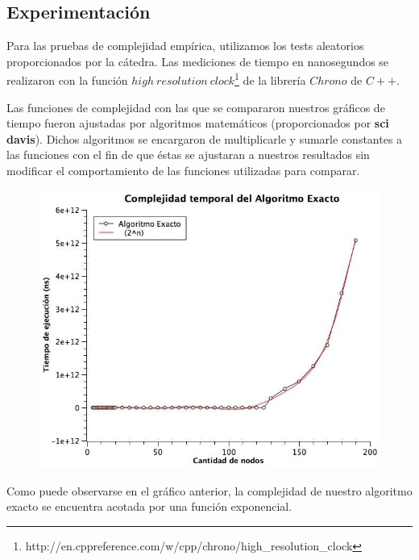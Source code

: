 \subsection{Experimentación}

Para las pruebas de complejidad empírica, utilizamos los tests aleatorios proporcionados por la cátedra. Las mediciones de tiempo en nanosegundos se realizaron con la función $high\ resolution\ clock$\footnote{http://en.cppreference.com/w/cpp/chrono/high\_resolution\_clock} de la librería $Chrono$ de $C++$. 

Las funciones de complejidad con las que se compararon nuestros gráficos de tiempo fueron ajustadas por algoritmos matemáticos (proporcionados por \textbf{sci davis}). Dichos algoritmos se encargaron de multiplicarle y sumarle constantes a las funciones con el fin de que éstas se ajustaran a nuestros resultados sin modificar el comportamiento de las funciones utilizadas para comparar.
	
\begin{figure}[H] %
\begin{center}
\includegraphics[width=350pt]{../imgs/exactoComplejidad.jpg}
\end{center}
\end{figure}

Como puede observarse en el gráfico anterior, la complejidad de nuestro algoritmo exacto se encuentra acotada por una función exponencial.



























